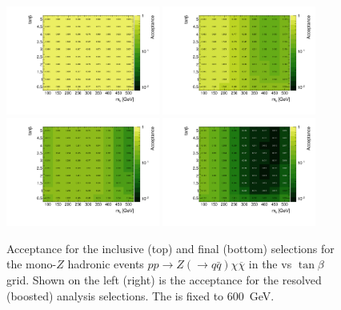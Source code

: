 \begin{figure}
\centering
\includegraphics[width=0.45\textwidth]{texinputs/04_grid/figures/monoz/hadronic/grid_tanb_ma_incl_resl_acc.pdf}
\includegraphics[width=0.45\textwidth]{texinputs/04_grid/figures/monoz/hadronic/grid_tanb_ma_incl_merged_acc.pdf}
\includegraphics[width=0.45\textwidth]{texinputs/04_grid/figures/monoz/hadronic/grid_tanb_ma_resl_acc.pdf}
\includegraphics[width=0.45\textwidth]{texinputs/04_grid/figures/monoz/hadronic/grid_tanb_ma_merged_acc.pdf}
\caption{Acceptance for the inclusive (top) and final (bottom) selections for the mono-$Z$ hadronic events 
$pp \rightarrow Z(\to q\bar{q})\chi\overline{\chi}$ in the \ma vs $\tan\beta$ grid. 
Shown on the left (right) is the acceptance for the resolved (boosted) analysis selections. 
The \mA is fixed to 600~GeV.}
\label{fig:monozhad_acc_ma-tanb_grid}
\end{figure}

